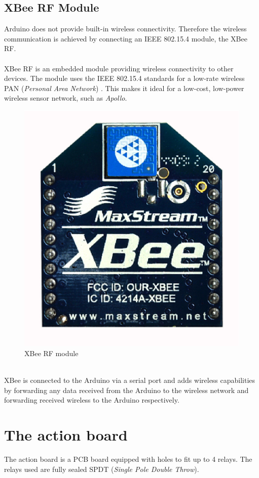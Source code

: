 \documentclass[12pt,a4paper,draft]{report}
\begin{document}
\subsection{XBee RF Module}
Arduino does not provide built-in wireless connectivity. Therefore the wireless communication is achieved by connecting an IEEE 802.15.4 module, the XBee RF. \\
\ \\
XBee RF is an embedded module providing wireless connectivity to other devices. The module uses the IEEE 802.15.4 standards for a low-rate wireless PAN (\textit{Personal Area Network}) \cite{website:xbee}. This makes it ideal for a low-cost, low-power wireless sensor network, such as \emph{Apollo}.
\begin{figure}[H]
    \centering
    \includegraphics*[scale=0.4]{xbee}
    \caption{XBee RF module}
\end{figure}
\ \\
XBee is connected to the Arduino via a serial port and adds wireless capabilities by forwarding any data received from the Arduino to the wireless network and forwarding received wireless to the Arduino respectively.
%
\section{The action board}
The action board is a PCB board equipped with holes to fit up to 4 relays. The relays used are fully sealed SPDT (\textit{Single Pole Double Throw}). \\
\ \\
%
\end{document}
